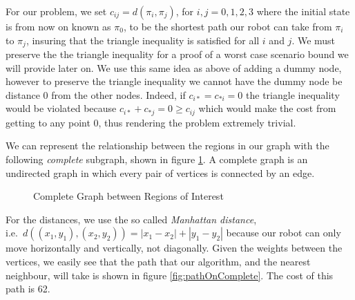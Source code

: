 For our problem, we set $c_{ij}=d(\pi_i , \pi_j)$, for $i,j=0,1,2,3$ where the initial state is from now on known as $\pi_0$, to be the shortest path our robot can take from $\pi_i$ to $\pi_j$, insuring that the triangle inequality is satisfied for all $i$ and $j$. We must preserve the the triangle inequality for a proof of a worst case scenario bound we will provide later on. We use this same idea as above of adding a dummy node, however to preserve the triangle inequality we cannot have the dummy node be distance 0 from the other nodes. Indeed, if $c_{i*} = c_{*i} = 0 $ the triangle inequality would be violated because $c_{i*} + c_{*j} = 0 \geq c_{ij}$ which would make the cost from getting to any point 0, thus rendering the problem extremely trivial. 

We can represent the relationship between the regions in our graph with the following \textit{complete} subgraph, shown in figure \ref{fig:completeGraph}. A complete graph is an undirected graph in which every pair of vertices is connected by an edge. 
\begin{figure}
\centering
{}
\caption{Complete Graph between Regions of Interest}
\label{fig:completeGraph}
\end{figure}

For the distances, we use the so called \textit{Manhattan distance},\\ i.e.\ $d((x_1,y_1),(x_2,y_2)) = |x_1 - x_2| +| y_1 - y_2|$ because our robot can only move horizontally and vertically, not diagonally. Given the weights between the vertices, we easily see that the path that our algorithm, and the nearest neighbour, will take is shown in figure \ref{fig:pathOnComplete}. The cost of this path is 62.

